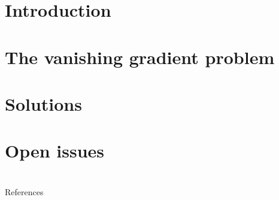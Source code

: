 \documentclass[xcolor=dvipsnames,10pt]{beamer}
\title[Recurrent neural network]{}
\author{Giulio Galvan}
\date{\today}
\begin{document}
\frame{\titlepage}
\section{Introduction}

\section{The vanishing gradient problem}

\section{Solutions}

\section{Open issues}


\section{}
\begin{frame}[allowframebreaks]{References}
	
	
\end{frame}
\end{document}
